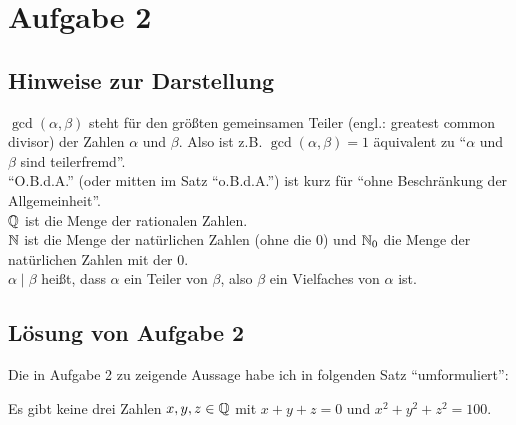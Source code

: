 \section{Aufgabe 2}

\subsection*{Hinweise zur Darstellung}

$\gcd(\alpha, \beta)$ steht für den größten gemeinsamen Teiler (engl.: greatest common divisor) der Zahlen $\alpha$ 
und $\beta$. Also ist z.B. $\gcd(\alpha, \beta) = 1$ äquivalent zu "`$\alpha$ und $\beta$ sind teilerfremd"'.\\
"`O.B.d.A."' (oder mitten im Satz "`o.B.d.A."') ist kurz für "`ohne Beschränkung der Allgemeinheit"'.\\
$\mathbb{Q}$ ist die Menge der rationalen Zahlen.\\
$\mathbb{N}$ ist die Menge der natürlichen Zahlen (ohne die 0) und $\mathbb{N}_0$ die Menge der natürlichen Zahlen mit der 0.\\
$\alpha \mid \beta$ heißt, dass $\alpha$ ein Teiler von $\beta$, also $\beta$ ein Vielfaches von $\alpha$ ist.

\subsection*{Lösung von Aufgabe 2}

Die in Aufgabe 2 zu zeigende Aussage habe ich in folgenden Satz "`umformuliert"':

\begin{thm}
    Es gibt keine drei Zahlen $x, y, z \in \mathbb{Q}$ mit $x + y + z = 0$ und $x^2 + y^2 + z^2 = 100$. \label{aufgabe_2}
\end{thm}

